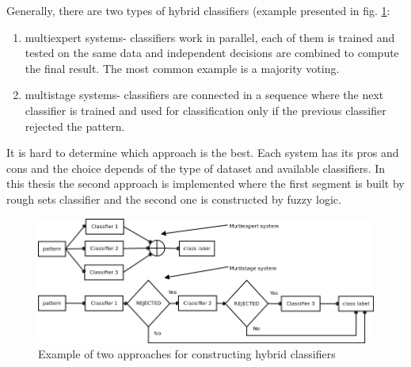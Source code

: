 Generally, there are two types of hybrid classifiers (example presented in fig.
\ref{fig:hybrid}:
\begin{enumerate}
    \item multiexpert systems- classifiers work in parallel, each of them is
        trained and tested on the same data and independent decisions are
        combined to compute the final result. The most common example is a
        majority voting.
    \item multistage systems- classifiers are connected in a sequence where the
        next classifier is trained and used for classification only if the
        previous classifier rejected the pattern. 
\end{enumerate}
It is hard to determine which approach is the best. Each system has its pros
and cons and the choice depends of the type of dataset and available
classifiers. In this thesis the second approach is implemented where the first
segment is built by rough sets classifier and the second one is constructed by
fuzzy logic.
\begin{figure}[H] 
    \begin{center}
        \includegraphics[width=\textwidth]{fig/hybrid.png}
    \end{center}
    \caption{Example of two approaches for constructing hybrid classifiers}
    \label{fig:hybrid}
\end{figure}

